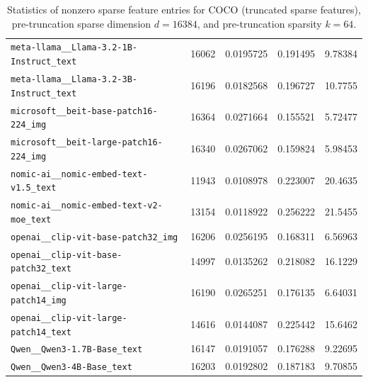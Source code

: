 \begin{table}[htbp]
{\begin{tabular}{lrrrr}
\texttt{meta-llama\_\_Llama-3.2-1B-Instruct\_text} & 16062 & 0.0195725 & 0.191495 & 9.78384 \\
\texttt{meta-llama\_\_Llama-3.2-3B-Instruct\_text} & 16196 & 0.0182568 & 0.196727 & 10.7755 \\
\texttt{microsoft\_\_beit-base-patch16-224\_img} & 16364 & 0.0271664 & 0.155521 & 5.72477 \\
\texttt{microsoft\_\_beit-large-patch16-224\_img} & 16340 & 0.0267062 & 0.159824 & 5.98453 \\
\texttt{nomic-ai\_\_nomic-embed-text-v1.5\_text} & 11943 & 0.0108978 & 0.223007 & 20.4635 \\
\texttt{nomic-ai\_\_nomic-embed-text-v2-moe\_text} & 13154 & 0.0118922 & 0.256222 & 21.5455 \\
\texttt{openai\_\_clip-vit-base-patch32\_img} & 16206 & 0.0256195 & 0.168311 & 6.56963 \\
\texttt{openai\_\_clip-vit-base-patch32\_text} & 14997 & 0.0135262 & 0.218082 & 16.1229 \\
\texttt{openai\_\_clip-vit-large-patch14\_img} & 16190 & 0.0265251 & 0.176135 & 6.64031 \\
\texttt{openai\_\_clip-vit-large-patch14\_text} & 14616 & 0.0144087 & 0.225442 & 15.6462 \\
\texttt{Qwen\_\_Qwen3-1.7B-Base\_text} & 16147 & 0.0191057 & 0.176288 & 9.22695 \\
\texttt{Qwen\_\_Qwen3-4B-Base\_text} & 16203 & 0.0192802 & 0.187183 & 9.70855 \\
\bottomrule
\end{tabular}
}%
\caption{Statistics of nonzero sparse feature entries for COCO (truncated sparse features), pre-truncation sparse dimension $d=16384$, and pre-truncation sparsity $k=64$.}
\label{tab:sparse-feature-entries-coco-truncated-d16384-k64}
\end{table}
